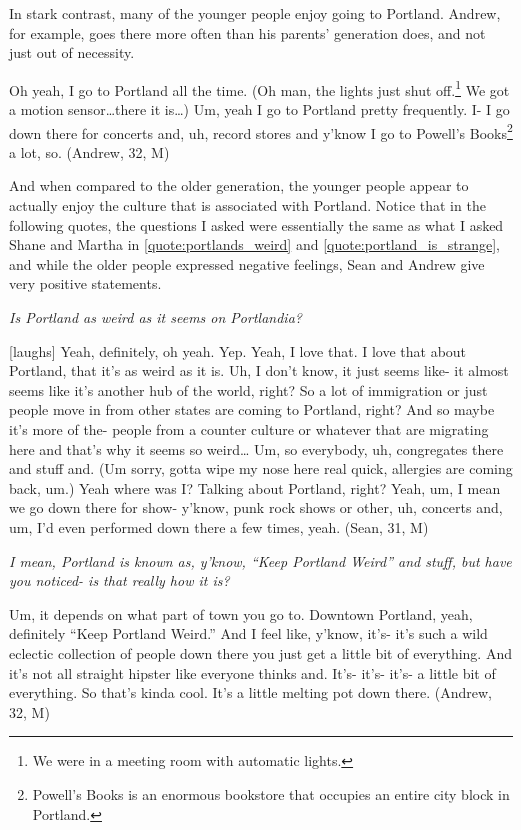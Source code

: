 In stark contrast, many of the younger people enjoy going to Portland. Andrew, for example,  goes there more often than his parents' generation does, and not just out of necessity.
\begin{num_quote}
    Oh yeah, I go to Portland all the time. (Oh man, the lights just shut off.\footnote{We were in a meeting room with automatic lights.} We got a motion sensor\ldots there it is\ldots) Um, yeah I go to Portland pretty frequently. I- I go down there for concerts and, uh, record stores and y'know I go to Powell's Books\footnote{Powell's Books is an enormous bookstore that occupies an entire city block in Portland.} a lot, so. (Andrew, 32, M)
    \label{quote:portland_all_the_time}
\end{num_quote}
And when compared to the older generation, the younger people appear to actually enjoy the culture that is associated with Portland. Notice that in the following quotes, the questions I asked were essentially the same as what I asked Shane and Martha in \ref{quote:portlands_weird} and \ref{quote:portland_is_strange}, and while the older people expressed negative feelings, Sean and Andrew give very positive statements.
\begin{num_quote}
    \textit{Is Portland as weird as it seems on Portlandia?}

    [laughs] Yeah, definitely, oh yeah. Yep. Yeah, I love that. I love that about Portland, that it's as weird as it is. Uh, I don't know, it just seems like- it almost seems like it's another hub of the world, right? So a lot of immigration or just people move in from other states are coming to Portland, right? And so maybe it's more of the- people from a counter culture or whatever that are migrating here and that's why it seems so weird… Um, so everybody, uh, congregates there and stuff and. (Um sorry, gotta wipe my nose here real quick, allergies are coming back, um.) Yeah where was I? Talking about Portland, right? Yeah, um, I mean we go down there for show- y'know, punk rock shows or other, uh, concerts and, um, I'd even performed down there a few times, yeah. (Sean, 31, M)\label{quote:i_love_portland}
\end{num_quote}
\begin{num_quote}
    \textit{I mean, Portland is known as, y'know, ``Keep Portland Weird'' and stuff, but have you noticed- is that really how it is?}

    Um, it depends on what part of town you go to. Downtown Portland, yeah, definitely ``Keep Portland Weird.'' And I feel like, y'know, it's- it's such a wild eclectic collection of people down there you just get a little bit of everything. And it's not all straight hipster like everyone thinks and. It's- it's- it's- a little bit of everything. So that's kinda cool. It's a little melting pot down there. (Andrew, 32, M)\label{quote:keep_portland_weird}
\end{num_quote}
